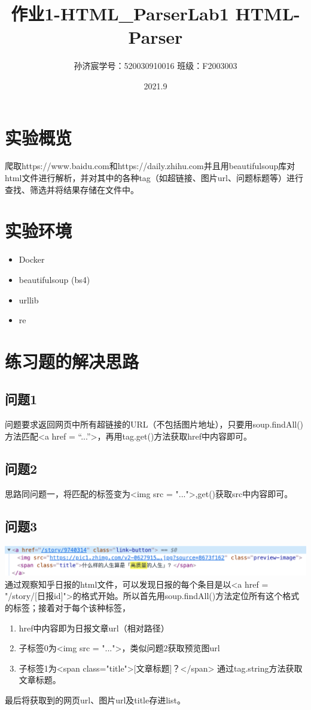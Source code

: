 \documentclass[12pt,a4paper]{article}
\title{作业1-HTML_Parser}
\title{Lab1 \quad HTML-Parser}
\date{2021.9}
\author{孙济宸\quad \quad 学号：520030910016 \quad  \quad 班级：F2003003}
\begin{document}
\maketitle
\section{实验概览}
爬取https://www.baidu.com和https://daily.zhihu.com并且用beautifulsoup库对html文件进行解析，并对其中的各种tag（如超链接、图片url、问题标题等）进行查找、筛选并将结果存储在文件中。
\section{实验环境}
\begin{itemize}
	\item Docker
	\item beautifulsoup (bs4)
	\item urllib
	\item re
\end{itemize}
\section{练习题的解决思路}
\subsection{问题1}
问题要求返回网页中所有超链接的URL（不包括图片地址），只要用soup.findAll()方法匹配<a href = “...”>，再用tag.get()方法获取href中内容即可。
\subsection{问题2}
思路同问题一，将匹配的标签变为<img src = "...">,get()获取src中内容即可。
\subsection{问题3}
\includegraphics[scale=0.6]{img1.png} \\
通过观察知乎日报的html文件，可以发现日报的每个条目是以<a href = "/story/[日报id]">的格式开始。所以首先用soup.findAll()方法定位所有这个格式的标签；接着对于每个该种标签，
\begin{enumerate}
	\item href中内容即为日报文章url（相对路径）
	\item 子标签0为<img src = "...">，类似问题2获取预览图url
	\item 子标签1为<span class="title">[文章标题]？</span> 通过tag.string方法获取文章标题。
\end{enumerate}
最后将获取到的网页url、图片url及title存进list。
\end{document}
